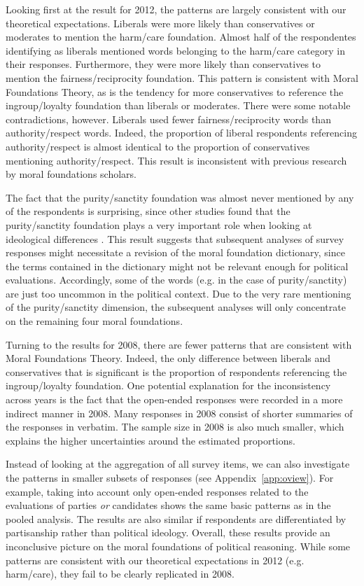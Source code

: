 \documentclass[12pt]{article}
\begin{document}
Looking first at the result for 2012, the patterns are largely consistent with our theoretical expectations. Liberals were more likely than conservatives or moderates to mention the harm/care foundation. Almost half of the respondentes identifying as liberals mentioned words belonging to the harm/care category in their responses. Furthermore, they were more likely than conservatives to mention the fairness/reciprocity foundation. This pattern is consistent with Moral Foundations Theory, as is the tendency for more conservatives to reference the ingroup/loyalty foundation than liberals or moderates. There were some notable contradictions, however. Liberals used fewer fairness/reciprocity words than authority/respect words. Indeed, the proportion of liberal respondents referencing authority/respect is almost identical to the proportion of conservatives mentioning authority/respect. This result is inconsistent with previous research by moral foundations scholars.

The fact that the purity/sanctity foundation was almost never mentioned by any of the respondents is surprising, since other studies found that the purity/sanctity foundation plays a very important role when looking at ideological differences \citep{koleva2012tracing}. This result suggests that subsequent analyses of survey responses might necessitate a revision of the moral foundation dictionary, since the terms contained in the dictionary might not be relevant enough for political evaluations. Accordingly, some of the words (e.g. in the case of purity/sanctity) are just too uncommon in the political context. Due to the very rare mentioning of the purity/sanctity dimension, the subsequent analyses will only concentrate on the remaining four moral foundations.

Turning to the results for 2008, there are fewer patterns that are consistent with Moral Foundations Theory. Indeed, the only difference between liberals and conservatives that is significant is the proportion of respondents referencing the ingroup/loyalty foundation. One potential explanation for the inconsistency across years is the fact that the open-ended responses were recorded in a more indirect manner in 2008. Many responses in 2008 consist of shorter summaries of the responses in verbatim. The sample size in 2008 is also much smaller, which explains the higher uncertainties around the estimated proportions.

Instead of looking at the aggregation of all survey items, we can also investigate the patterns in smaller subsets of responses (see Appendix~\ref{app:oview}). For example, taking into account only open-ended responses related to the evaluations of parties \textit{or} candidates shows the same basic patterns as in the pooled analysis. The results are also similar if respondents are differentiated by partisanship rather than political ideology. Overall, these results provide an inconclusive picture on the moral foundations of political reasoning. While some patterns are consistent with our theoretical expectations in 2012 (e.g. harm/care), they fail to be clearly replicated in 2008.
\end{document}
